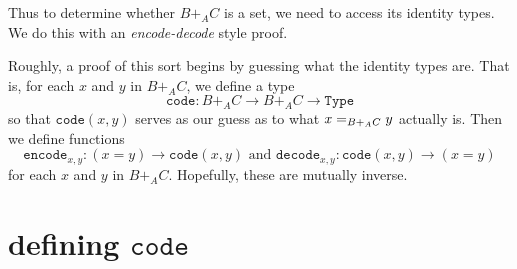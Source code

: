 \documentclass[12pt]{amsart}
\newcommand{\from}{\colon}
\newcommand{\type}[1]{\mathtt{#1}}
\theoremstyle{remark}
\theoremstyle{definition}
\begin{document}
Thus to determine whether $B +_A C$ is a set,
we need to access its identity types.  
We do this with an \emph{encode-decode} style proof.  

Roughly, a proof of this sort begins by guessing
what the identity types are.  That is,
for each $x$ and $y$ in $B +_A C$, 
we define a type 
\[
	\type{code} \from B +_A C \to B +_A C \to \type{Type}
\]
so that $\type{code}(x,y)$ serves as our guess  
as to what $x =_{\scriptsize B +_A C} y$ actually is.  
Then we define functions
\[
	\type{ encode }_{ x , y } \from  ( x = y ) \to \type{code} ( x , y ) 
	\text{ and }
	\type{ decode }_{ x , y } \from \type{code} ( x , y ) \to ( x = y )
\]
for each $x$ and $y$ in $B +_A C$.  
Hopefully, these are mutually inverse.

% 
\section{defining $\type{code}$}
\end{document}
